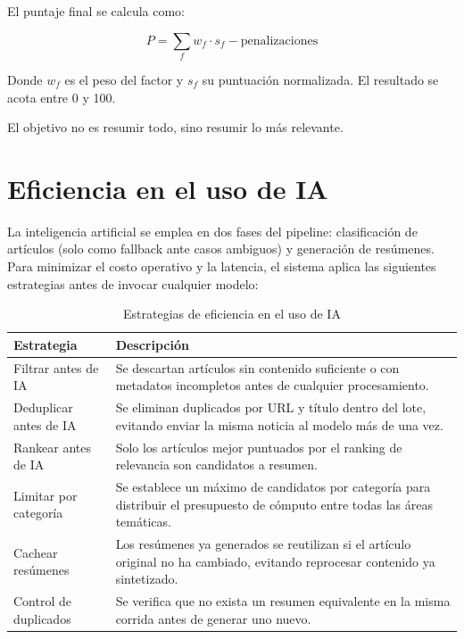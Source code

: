 \documentclass[12pt,oneside]{report}
\begin{document}
El puntaje final se calcula como:

\begin{equation}
P = \sum_{f} w_f \cdot s_f - \text{penalizaciones}
\end{equation}

Donde $w_f$ es el peso del factor y $s_f$ su puntuaci\'on normalizada. El resultado se acota entre 0 y 100.

El objetivo no es resumir todo, sino resumir lo m\'as relevante.

\section{Eficiencia en el uso de IA}

La inteligencia artificial se emplea en dos fases del pipeline: clasificaci\'on de art\'iculos (solo como fallback ante casos ambiguos) y generaci\'on de res\'umenes. Para minimizar el costo operativo y la latencia, el sistema aplica las siguientes estrategias antes de invocar cualquier modelo:

\begin{table}[H]
\centering
\begin{tabular}{lp{10cm}}
\toprule
\textbf{Estrategia} & \textbf{Descripci\'on} \\
\midrule
Filtrar antes de IA  & Se descartan art\'iculos sin contenido suficiente o con metadatos incompletos antes de cualquier procesamiento. \\
\midrule
Deduplicar antes de IA & Se eliminan duplicados por URL y t\'itulo dentro del lote, evitando enviar la misma noticia al modelo m\'as de una vez. \\
\midrule
Rankear antes de IA  & Solo los art\'iculos mejor puntuados por el ranking de relevancia son candidatos a resumen. \\
\midrule
Limitar por categor\'ia & Se establece un m\'aximo de candidatos por categor\'ia para distribuir el presupuesto de c\'omputo entre todas las \'areas tem\'aticas. \\
\midrule
Cachear res\'umenes  & Los res\'umenes ya generados se reutilizan si el art\'iculo original no ha cambiado, evitando reprocesar contenido ya sintetizado. \\
\midrule
Control de duplicados & Se verifica que no exista un resumen equivalente en la misma corrida antes de generar uno nuevo. \\
\bottomrule
\end{tabular}
\caption{Estrategias de eficiencia en el uso de IA}
\end{table}
\end{document}
